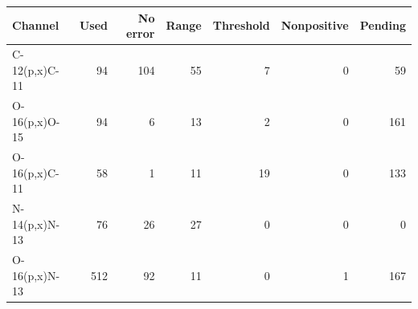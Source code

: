 \begin{tabular}{lrrrrrr}
\toprule
Channel & Used & No error & Range & Threshold & Nonpositive & Pending \\
\midrule
C-12(p,x)C-11 & 94 & 104 & 55 & 7 & 0 & 59 \\
O-16(p,x)O-15 & 94 & 6 & 13 & 2 & 0 & 161 \\
O-16(p,x)C-11 & 58 & 1 & 11 & 19 & 0 & 133 \\
N-14(p,x)N-13 & 76 & 26 & 27 & 0 & 0 & 0 \\
O-16(p,x)N-13 & 512 & 92 & 11 & 0 & 1 & 167 \\
\bottomrule
\end{tabular}
